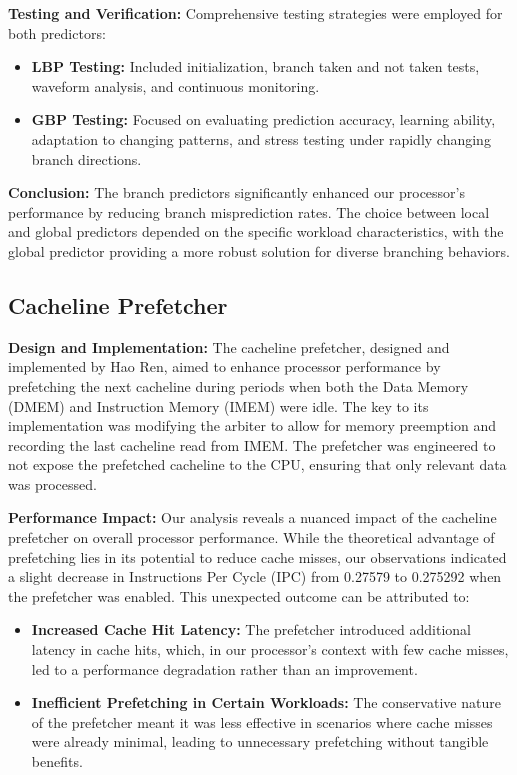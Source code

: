 \documentclass[12pt, a4paper]{article}
\begin{document}
    \textbf{Testing and Verification:}
    Comprehensive testing strategies were employed for both predictors:
    \begin{itemize}
        \item \textbf{LBP Testing:} Included initialization, branch taken and not taken tests, waveform analysis, and continuous monitoring.
        \item \textbf{GBP Testing:} Focused on evaluating prediction accuracy, learning ability, adaptation to changing patterns, and stress testing under rapidly changing branch directions.
    \end{itemize}
    
    \textbf{Conclusion:}
    The branch predictors significantly enhanced our processor's performance by reducing branch misprediction rates. The choice between local and global predictors depended on the specific workload characteristics, with the global predictor providing a more robust solution for diverse branching behaviors.


    \subsection{Cacheline Prefetcher}

    \textbf{Design and Implementation:}
    The cacheline prefetcher, designed and implemented by Hao Ren, aimed to enhance processor performance by prefetching the next cacheline during periods when both the Data Memory (DMEM) and Instruction Memory (IMEM) were idle. The key to its implementation was modifying the arbiter to allow for memory preemption and recording the last cacheline read from IMEM. The prefetcher was engineered to not expose the prefetched cacheline to the CPU, ensuring that only relevant data was processed.
    
    \textbf{Performance Impact:}
    Our analysis reveals a nuanced impact of the cacheline prefetcher on overall processor performance. While the theoretical advantage of prefetching lies in its potential to reduce cache misses, our observations indicated a slight decrease in Instructions Per Cycle (IPC) from 0.27579 to 0.275292 when the prefetcher was enabled. This unexpected outcome can be attributed to:
    \begin{itemize}
        \item \textbf{Increased Cache Hit Latency:} The prefetcher introduced additional latency in cache hits, which, in our processor's context with few cache misses, led to a performance degradation rather than an improvement.
        \item \textbf{Inefficient Prefetching in Certain Workloads:} The conservative nature of the prefetcher meant it was less effective in scenarios where cache misses were already minimal, leading to unnecessary prefetching without tangible benefits.
    \end{itemize}
    
\end{document}
